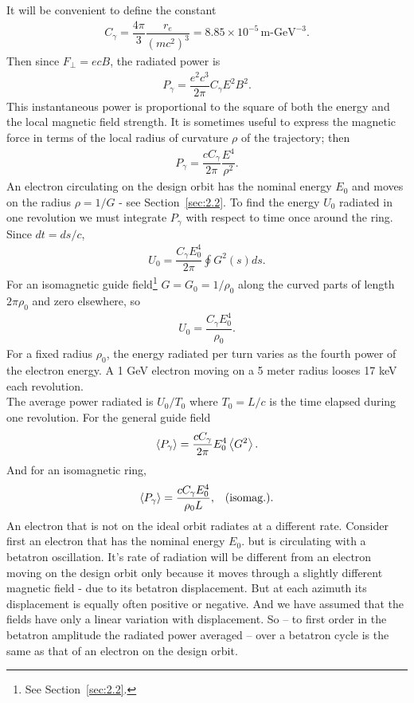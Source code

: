 It will be convenient to define the constant
\begin{align} \label{eq:4.2}
	C_\gamma = \dfrac{4 \pi}{3} \dfrac{r_e}{(m c^2)^3} = 8.85 \times 10^{-5}\, \text{m-GeV}^{-3}.
\end{align}
Then since $F_\perp = ecB$, the radiated power is
\begin{align} \label{eq:4.3}
	P_\gamma = \dfrac{e^2 c^3}{2 \pi} C_\gamma E^2 B^2.
\end{align}
This instantaneous power is proportional to the square of both the energy and the local magnetic field strength. It is sometimes useful to express the magnetic force in terms of the local radius of curvature $\rho$ of the trajectory; then
\begin{align} \label{eq:4.4}
	P_\gamma = \dfrac{c C_\gamma}{2 \pi}\dfrac{E^4}{\rho^2}.
\end{align}
An electron circulating on the design orbit has the nominal energy $E_0$ and moves on the radius $\rho = 1/G$ - see Section~\ref{sec:2.2}. To find the energy $U_0$ radiated in one revolution
 we must integrate $P_\gamma$ with respect to time once around the ring. Since $dt = ds/c$,
\begin{align} \label{eq:4.7}
	U_0 = \dfrac{C_\gamma E_0^4}{2 \pi} \oint G^2(s) ds.
\end{align}
For an isomagnetic guide field\footnote{See Section~\ref{sec:2.2}.} $G = G_0 = 1/\rho_0$ along the curved parts of length $2 \pi \rho_0$ and zero elsewhere, so
\begin{align} \label{eq:4.8}
	U_0 = \dfrac{C_\gamma E_0^4}{\rho_0}.
\end{align}
For a fixed radius $\rho_0$, the energy radiated per turn varies as the fourth power of the electron energy. A 1 GeV electron moving on a 5 meter radius looses 17 keV each revolution.\\
The average power radiated is $U_0/T_0$ where $T_0= L/c$ is the time elapsed during one revolution. For the general guide field
\begin{align} \label{eq:4.9}
	\left< P_\gamma \right> = \dfrac{cC_\gamma}{2\pi} E_0^4 \left< G^2 \right>.
\end{align}
And for an isomagnetic ring,
\begin{align} \label{eq:4.10}
	\left< P_\gamma \right> = \dfrac{c C_\gamma E_0^4}{\rho_0 L}, && \text{(isomag.).}
\end{align}
An electron that is not on the ideal orbit radiates at a different rate. Consider first an electron that has the nominal energy $E_0$. but is circulating with a betatron oscillation. It's rate of radiation will be different from an electron moving on the design orbit only because it moves through a slightly different magnetic field - due to its betatron displacement. But at each azimuth its displacement is equally often positive or negative. And we have assumed that the fields have only a linear variation with displacement. So -- to first order in the betatron amplitude the radiated power averaged -- over a betatron cycle is the same as that of an electron on the design orbit.\\
